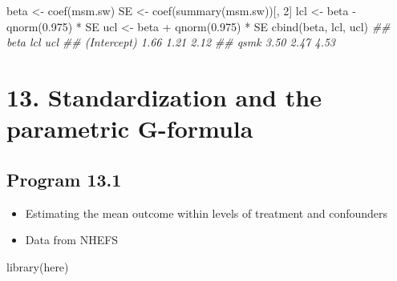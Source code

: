 \documentclass[
  10pt,
  a4paper,
]{book}
\newenvironment{Shaded}{\begin{snugshade}}{\end{snugshade}}
\newcommand{\DecValTok}[1]{\textcolor[rgb]{0.68,0.00,0.00}{#1}}
\newcommand{\DocumentationTok}[1]{\textcolor[rgb]{0.37,0.37,0.37}{\textit{#1}}}
\newcommand{\FloatTok}[1]{\textcolor[rgb]{0.68,0.00,0.00}{#1}}
\newcommand{\FunctionTok}[1]{\textcolor[rgb]{0.28,0.35,0.67}{#1}}
\newcommand{\NormalTok}[1]{\textcolor[rgb]{0.00,0.46,0.62}{#1}}
\newcommand{\OtherTok}[1]{\textcolor[rgb]{0.00,0.46,0.62}{#1}}
\newcommand{\SpecialCharTok}[1]{\textcolor[rgb]{0.37,0.37,0.37}{#1}}
\providecommand{\tightlist}{%
  \setlength{\itemsep}{0pt}\setlength{\parskip}{0pt}}
\begin{document}
\begin{Shaded}
\begin{Highlighting}[]
\NormalTok{beta }\OtherTok{\textless{}{-}} \FunctionTok{coef}\NormalTok{(msm.sw)}
\NormalTok{SE }\OtherTok{\textless{}{-}} \FunctionTok{coef}\NormalTok{(}\FunctionTok{summary}\NormalTok{(msm.sw))[, }\DecValTok{2}\NormalTok{]}
\NormalTok{lcl }\OtherTok{\textless{}{-}}\NormalTok{ beta }\SpecialCharTok{{-}} \FunctionTok{qnorm}\NormalTok{(}\FloatTok{0.975}\NormalTok{) }\SpecialCharTok{*}\NormalTok{ SE}
\NormalTok{ucl }\OtherTok{\textless{}{-}}\NormalTok{ beta }\SpecialCharTok{+} \FunctionTok{qnorm}\NormalTok{(}\FloatTok{0.975}\NormalTok{) }\SpecialCharTok{*}\NormalTok{ SE}
\FunctionTok{cbind}\NormalTok{(beta, lcl, ucl)}
\DocumentationTok{\#\#             beta  lcl  ucl}
\DocumentationTok{\#\# (Intercept) 1.66 1.21 2.12}
\DocumentationTok{\#\# qsmk        3.50 2.47 4.53}
\end{Highlighting}
\end{Shaded}

\chapter*{13. Standardization and the parametric G-formula}\label{standardization-and-the-parametric-g-formula}

\section{Program 13.1}\label{program-13.1}

\begin{itemize}
\tightlist
\item
  Estimating the mean outcome within levels of treatment and confounders
\item
  Data from NHEFS
\end{itemize}

\begin{Shaded}
\begin{Highlighting}[]
\FunctionTok{library}\NormalTok{(here)}
\end{Highlighting}
\end{Shaded}
\end{document}
